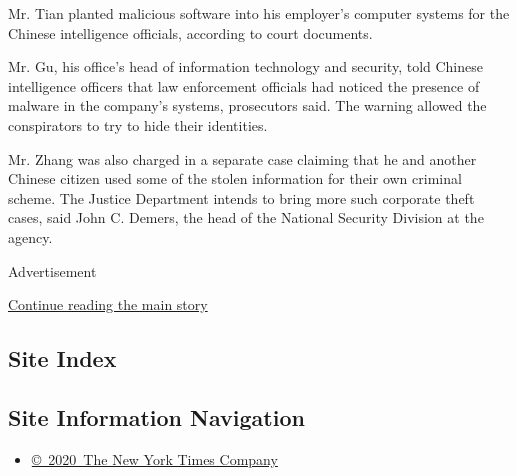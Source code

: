 Mr. Tian planted malicious software into his employer's computer systems
for the Chinese intelligence officials, according to court documents.

Mr. Gu, his office's head of information technology and security, told
Chinese intelligence officers that law enforcement officials had noticed
the presence of malware in the company's systems, prosecutors said. The
warning allowed the conspirators to try to hide their identities.

Mr. Zhang was also charged in a separate case claiming that he and
another Chinese citizen used some of the stolen information for their
own criminal scheme. The Justice Department intends to bring more such
corporate theft cases, said John C. Demers, the head of the National
Security Division at the agency.

Advertisement

\protect\hyperlink{after-bottom}{Continue reading the main story}

\hypertarget{site-index}{%
\subsection{Site Index}\label{site-index}}

\hypertarget{site-information-navigation}{%
\subsection{Site Information
Navigation}\label{site-information-navigation}}

\begin{itemize}
\tightlist
\item
  \href{https://help.nytimes.com/hc/en-us/articles/115014792127-Copyright-notice}{©~2020~The
  New York Times Company}
\end{itemize}

